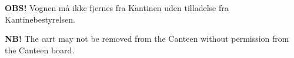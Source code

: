 \documentclass{article}
\begin{document}
\maketitle

\null
\vspace{-1.5cm}


\vspace{-0.4in}

\begin{center}

\huge
\textbf{OBS!} Vognen må ikke fjernes fra Kantinen uden tilladelse fra
Kantinebestyrelsen.

\end{center}

\english


\vspace{-0.4in}

\begin{center}

\huge \textbf{NB!} The cart may not be removed from the Canteen without
permission from the Canteen board.

\end{center}

\dansk

\underskriv
\end{document}
